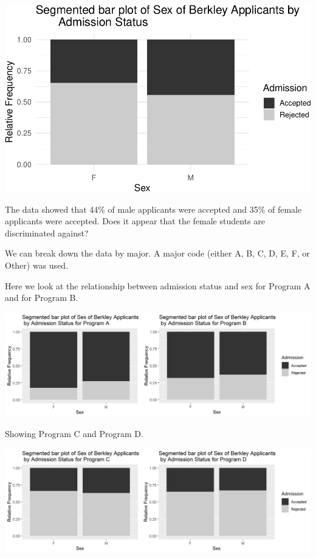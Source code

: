 \documentclass[
]{report}
\begin{document}
\begin{center}\includegraphics[width=0.85\linewidth]{08-VN08-two-cat-simulation_files/figure-latex/unnamed-chunk-7-1} \end{center}

The data showed that 44\% of male applicants were accepted and 35\% of female applicants were accepted. Does it appear that the female students are discriminated against?

\vspace{0.1in}

We can break down the data by major. A major code (either A, B, C, D, E, F, or Other) was used.

\newpage

Here we look at the relationship between admission status and sex for Program A and for Program B.

\begin{center}\includegraphics[width=0.85\linewidth]{images/SimPara_AB} \end{center}

Showing Program C and Program D.

\begin{center}\includegraphics[width=0.85\linewidth]{images/SimPara_cD} \end{center}
\end{document}
